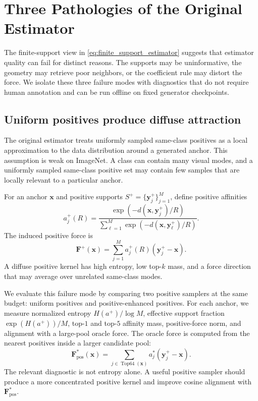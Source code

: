 \documentclass{article}
\newcommand{\F}{\mathbf{F}}
\newcommand{\x}{\mathbf{x}}
\newcommand{\yp}{\mathbf{y}^{+}}
\begin{document}

\section{Three Pathologies of the Original Estimator}
\label{sec:pathologies}

The finite-support view in \cref{eq:finite_support_estimator} suggests that estimator quality can fail for distinct reasons.
The supports may be uninformative, the geometry may retrieve poor neighbors, or the coefficient rule may distort the force.
We isolate these three failure modes with diagnostics that do not require human annotation and can be run offline on fixed generator checkpoints.

\subsection{Uniform positives produce diffuse attraction}
\label{subsec:diffuse_positives}

The original estimator treats uniformly sampled same-class positives as a local approximation to the data distribution around a generated anchor.
This assumption is weak on ImageNet.
A class can contain many visual modes, and a uniformly sampled same-class positive set may contain few samples that are locally relevant to a particular anchor.

For an anchor $\x$ and positive supports $S^+=\{\yp_j\}_{j=1}^{M}$, define positive affinities
\begin{equation}
a_j^{+}(R)
=
\frac{\exp(-d(\x,\yp_j)/R)}
{\sum_{\ell=1}^{M}\exp(-d(\x,\yp_\ell)/R)}.
\label{eq:positive_affinity}
\end{equation}
The induced positive force is
\begin{equation}
\F^{+}(\x)
=
\sum_{j=1}^{M}
a_j^{+}(R)(\yp_j-\x).
\label{eq:positive_force}
\end{equation}
A diffuse positive kernel has high entropy, low top-$k$ mass, and a force direction that may average over unrelated same-class modes.

We evaluate this failure mode by comparing two positive samplers at the same budget:
uniform positives and positive-enhanced positives.
For each anchor, we measure normalized entropy $H(a^+)/\log M$, effective support fraction $\exp(H(a^+))/M$, top-$1$ and top-$5$ affinity mass, positive-force norm, and alignment with a large-pool oracle force.
The oracle force is computed from the nearest positives inside a larger candidate pool:
\begin{equation}
\F^{*}_{\mathrm{pos}}(\x)
=
\sum_{j\in\operatorname{Top64}(\x)}
a_j^{*}(\yp_j-\x).
\label{eq:oracle_positive_force}
\end{equation}
The relevant diagnostic is not entropy alone.
A useful positive sampler should produce a more concentrated positive kernel and improve cosine alignment with $\F^{*}_{\mathrm{pos}}$.
\end{document}
